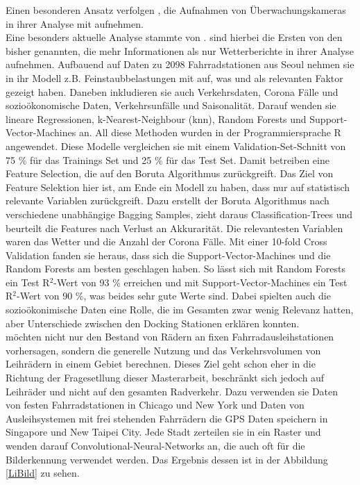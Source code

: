 \documentclass[a4paper,12pt]{thesis}
\begin{document}
Einen besonderen Ansatz verfolgen \cite{Colace2020}, die Aufnahmen von Überwachungskameras in ihrer Analyse mit aufnehmen.\\
Eine besonders aktuelle Analyse stammte von \cite{Gao2022}. \cite{Gao2022} sind hierbei die Ersten von den bisher genannten, die mehr Informationen als nur Wetterberichte in ihrer Analyse aufnehmen. Aufbauend auf Daten zu 2098 Fahrradstationen aus Seoul nehmen sie in ihr Modell z.B. Feinstaubbelastungen mit auf, was \cite{Hong2022} und \cite{ZHAO2018826} als relevanten Faktor gezeigt haben. Daneben inkludieren sie auch Verkehrsdaten, Corona Fälle und sozioökonomische Daten, Verkehrsunfälle und Saisonalität. Darauf wenden sie lineare Regressionen, k-Nearest-Neighbour (knn), Random Forests und Support-Vector-Machines an. All diese Methoden wurden in der Programmiersprache R angewendet. Diese Modelle vergleichen sie mit einem Validation-Set-Schnitt von 75 \% für das Trainings Set und 25 \% für das Test Set. Damit betreiben \cite{Gao2022} eine Feature Selection, die auf den Boruta Algorithmus zurückgreift. Das Ziel von Feature Selektion hier ist, am Ende ein Modell zu haben, dass nur auf statistisch relevante Variablen zurückgreift. Dazu erstellt der Boruta Algorithmus nach \cite{Kursa2010} verschiedene unabhängige Bagging Samples, zieht daraus Classification-Trees und beurteilt die Features nach Verlust an Akkurarität. Die relevantesten Variablen waren das Wetter und die Anzahl der Corona Fälle. Mit einer 10-fold Cross Validation fanden sie heraus, dass sich die Support-Vector-Machines und die Random Forests am besten geschlagen haben. So lässt sich mit Random Forests ein Test R$^2$-Wert von 93 \% erreichen und mit Support-Vector-Machines ein Test R$^2$-Wert von 90 \%, was beides sehr gute Werte sind. Dabei spielten auch die sozioökonimische Daten eine Rolle, die im Gesamten zwar wenig Relevanz hatten, aber Unterschiede zwischen den Docking Stationen erklären konnten.\\ 
\cite{Li2022} möchten nicht nur den Bestand von Rädern an fixen Fahrradausleihstationen vorhersagen, sondern die generelle Nutzung und das Verkehrsvolumen von Leihrädern in einem Gebiet berechnen. Dieses Ziel geht schon eher in die Richtung der Fragesetllung dieser Masterarbeit, beschränkt sich jedoch auf Leihräder und nicht auf den gesamten Radverkehr. Dazu verwenden sie Daten von festen Fahrradstationen in Chicago und New York und Daten von Ausleihsystemen mit frei stehenden Fahrrädern die GPS Daten speichern in Singapore und New Taipei City. Jede Stadt zerteilen sie in ein Raster und wenden darauf Convolutional-Neural-Networks an, die auch oft für die Bilderkennung verwendet werden. Das Ergebnis dessen ist in der Abbildung \ref{LiBild} zu sehen.\\
\end{document}
